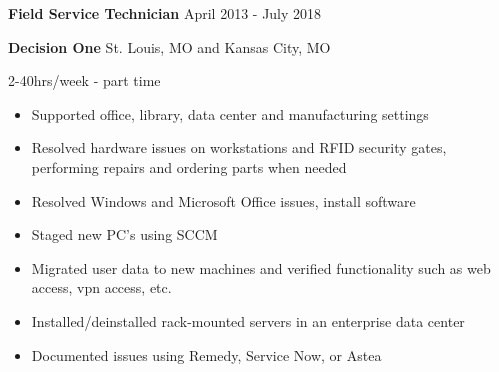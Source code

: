 \documentclass[../main.tex]{subfiles}
\begin{document}
\textbf{Field Service Technician}
\hfill
April 2013 - July 2018

\textbf{Decision One} 
\hfill 
St. Louis, MO and Kansas City, MO

\hfill 
2-40hrs/week - part time

\begin{itemize}
\item Supported office, library, data center and manufacturing settings
\item Resolved hardware issues on workstations and RFID security gates, performing repairs and ordering parts when needed
\item Resolved Windows and Microsoft Office issues, install software
\item Staged new PC's using SCCM
\item Migrated user data to new machines and verified functionality such as web access, vpn access, etc.
\item Installed/deinstalled rack-mounted servers in an enterprise data center
\item Documented issues using Remedy, Service Now, or Astea
\end{itemize}
\end{document}
